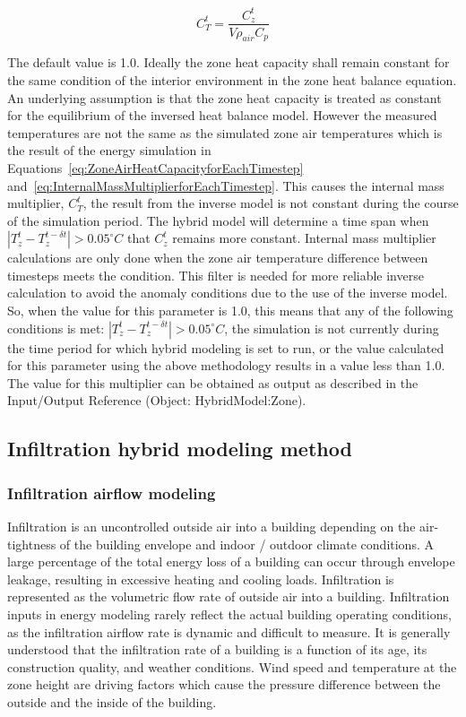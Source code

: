 \begin{equation}
C_T^t = \frac{C_z^t} {V\rho_{air} C_p}
\label{eq:InternalMassMultiplierforEachTimestep}
\end{equation}

The default value is 1.0. Ideally the zone heat capacity shall remain constant for the same condition of the interior environment in the zone heat balance equation. An underlying assumption is that the zone heat capacity is treated as constant for the equilibrium of the inversed heat balance model. However the measured temperatures are not the same as the simulated zone air temperatures which is the result of the energy simulation in Equations~\ref{eq:ZoneAirHeatCapacityforEachTimestep} and~\ref{eq:InternalMassMultiplierforEachTimestep}. This causes the internal mass multiplier, $C_T^t$, the result from the inverse model is not constant during the course of the simulation period. The hybrid model will determine a time span when $|T_z^t - T_z^{t-\delta t}| > 0.05^{\circ}C$ that $C_z^t$ remains more constant. Internal mass multiplier calculations are only done when the zone air temperature difference between timesteps meets the condition. This filter is needed for more reliable inverse calculation to avoid the anomaly conditions due to the use of the inverse model.  So, when the value for this parameter is 1.0, this means that any of the following conditions is met: $|T_z^t - T_z^{t-\delta t}| > 0.05^{\circ}C$, the simulation is not currently during the time period for which hybrid modeling is set to run, or the value calculated for this parameter using the above methodology results in a value less than 1.0.  The value for this multiplier can be obtained as output as described in the Input/Output Reference (Object: HybridModel:Zone).

\subsection{Infiltration hybrid modeling method}\label{Infiltration hybrid modeling method}

\subsubsection{Infiltration airflow modeling}\label{Infiltration airflow modeling}

Infiltration is an uncontrolled outside air into a building depending on the air-tightness of the building envelope and indoor / outdoor climate conditions. A large percentage of the total energy loss of a building can occur through envelope leakage, resulting in excessive heating and cooling loads. Infiltration is represented as the volumetric flow rate of outside air into a building. Infiltration inputs in energy modeling rarely reflect the actual building operating conditions, as the infiltration airflow rate is dynamic and difficult to measure. It is generally understood that the infiltration rate of a building is a function of its age, its construction quality, and weather conditions. Wind speed and temperature at the zone height are driving factors which cause the pressure difference between the outside and the inside of the building.

